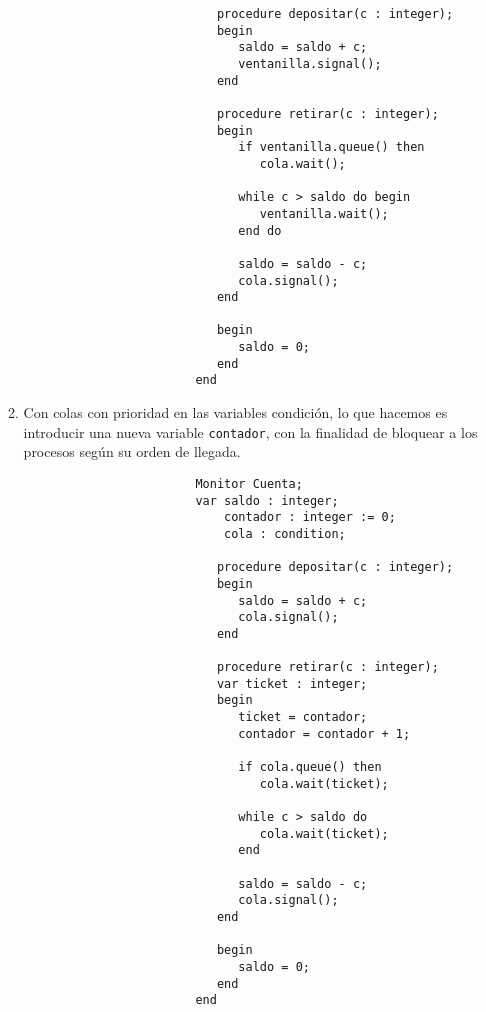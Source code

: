 \begin{ejercicio}
\begin{enumerate}
\begin{enumerate}[label=\alph*)]
\begin{verbatim}
                           procedure depositar(c : integer);
                           begin
                              saldo = saldo + c;
                              ventanilla.signal();
                           end

                           procedure retirar(c : integer);
                           begin
                              if ventanilla.queue() then
                                 cola.wait();

                              while c > saldo do begin
                                 ventanilla.wait();
                              end do

                              saldo = saldo - c;
                              cola.signal();
                           end

                           begin
                              saldo = 0;
                           end
                        end
                    \end{verbatim}
                \item Con colas con prioridad en las variables condición, lo que hacemos es introducir una nueva variable \verb|contador|, con la finalidad de bloquear a los procesos según su orden de llegada.
                    \begin{verbatim}
                        Monitor Cuenta;
                        var saldo : integer;
                            contador : integer := 0;
                            cola : condition;

                           procedure depositar(c : integer);
                           begin
                              saldo = saldo + c;
                              cola.signal();
                           end

                           procedure retirar(c : integer);
                           var ticket : integer;
                           begin
                              ticket = contador;
                              contador = contador + 1;

                              if cola.queue() then 
                                 cola.wait(ticket);

                              while c > saldo do
                                 cola.wait(ticket);
                              end

                              saldo = saldo - c;
                              cola.signal();
                           end

                           begin
                              saldo = 0;
                           end
                        end
                    \end{verbatim}
            \end{enumerate}
    \end{enumerate}
\end{ejercicio}

